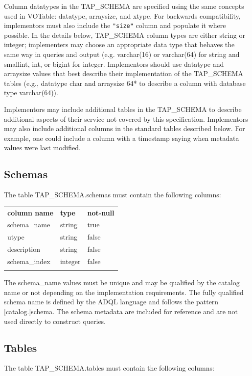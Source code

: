 \documentclass[11pt,letter]{ivoa}
\newcommand{\tapschema}{TAP\_SCHE\-MA}
\newcommand{\tapschema}{\mbox{%
  \relsize{-0.5}TAP\discretionary{-}{}{\kern-2pt\_}SCHEMA}}
\begin{document}
Column datatypes in the \tapschema{} are specified using the same concepts used in 
VOTable: datatype, arraysize, and xtype. For backwards compatibility, implementors
must also include the \verb|"size"| column and populate it where possible. In the details
below, \tapschema{} column types are either string or integer; implementers may choose an 
appropriate data type that behaves the same way in queries and output (e.g. varchar(16) or
varchar(64) for string and smallint, int, or bigint for integer.
Implementors should use datatype and arraysize values
that best describe their implementation of the \tapschema{} tables (e.g., datatype char 
and arraysize 64* to describe a column with database type varchar(64)).

Implementors may include additional tables in the 
\tapschema{} to describe additional aspects of their service not 
covered by this specification. Implementors may also include additional columns 
in the standard tables described below. For example, one could include a column 
with a timestamp saying when metadata values were last modified.

\subsection{Schemas}
\label{sec:tap-schema-schemas}

The table \tapschema.schemas must contain the following columns:

\begin{inlinetable}
\begin{tabular}{l l l}
\sptablerule
\textbf{column name} & \textbf{type} & \textbf{not-null} \\
\sptablerule
schema\_name & string & true \\
utype & string & false \\
description & string & false \\
schema\_index & integer & false \\
\sptablerule
\end{tabular}
\end{inlinetable}

The schema\_name values must be unique and may be qualified by the 
catalog name or not depending on the implementation requirements. The fully 
qualified schema name is defined by the ADQL language and  follows the pattern 
[catalog.]schema. The schema metadata are included for reference and are not 
used directly to construct queries.

\subsection{Tables}
\label{sec:tap-schema-tables}
The table \tapschema.tables must contain the following columns:
\end{document}
